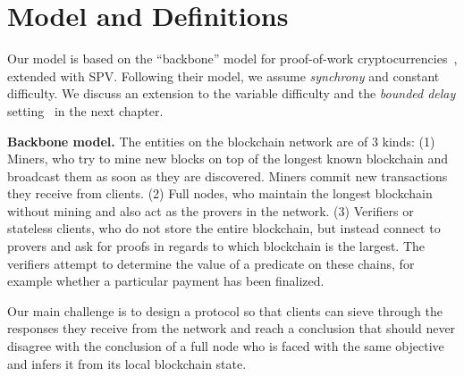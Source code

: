 \section{Model and Definitions}
\label{sec:model}
Our model is based on the ``backbone'' model for proof-of-work
cryptocurrencies~\cite{backbone}, extended with SPV. Following their model, we
assume \emph{synchrony}
and constant difficulty. We discuss an extension to the variable difficulty and the \emph{bounded delay} setting~\cite{pass-asynchronous} in the next chapter.


\noindent
\textbf{Backbone model.}
The entities on the blockchain network are of 3 kinds: (1) Miners, who try to
mine new blocks on top of the longest known blockchain and broadcast them as
soon as they are discovered. Miners commit new transactions they receive from clients. (2) Full nodes, who maintain the longest blockchain
without mining and also act as the provers in the network. (3) Verifiers or
stateless clients, who do not store the entire blockchain, but instead connect to provers and ask for proofs in regards to which
blockchain is the largest. The verifiers attempt to determine the value of a
predicate on these chains, for example whether a particular payment has been finalized.

Our main challenge is to design
a protocol so that clients can sieve through  the responses they receive from
the network and reach a conclusion that should never disagree with the
conclusion of a full  node who is faced with the same objective and infers it
from its local blockchain state.


